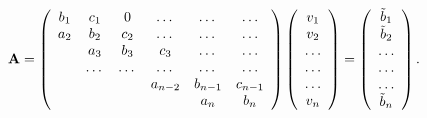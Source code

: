 \documentclass{article}
\begin{document}
\begin{equation}
    {\bf A} = \left(\begin{array}{cccccc}
                           b_1& c_1 & 0 &\dots   & \dots &\dots \\
                           a_2 & b_2 & c_2 &\dots &\dots &\dots \\
                           & a_3 & b_3 & c_3 & \dots & \dots \\
                           & \dots   & \dots &\dots   &\dots & \dots \\
                           &   &  &a_{n-2}  &b_{n-1}& c_{n-1} \\
                           &    &  &   &a_n & b_n \\
                      \end{array} \right)\left(\begin{array}{c}
                           v_1\\
                           v_2\\
                           \dots \\
                          \dots  \\
                          \dots \\
                           v_n\\
                      \end{array} \right)
  =\left(\begin{array}{c}
                           \tilde{b}_1\\
                           \tilde{b}_2\\
                           \dots \\
                           \dots \\
                          \dots \\
                           \tilde{b}_n\\
                      \end{array} \right).
\end{equation}
\end{document}
